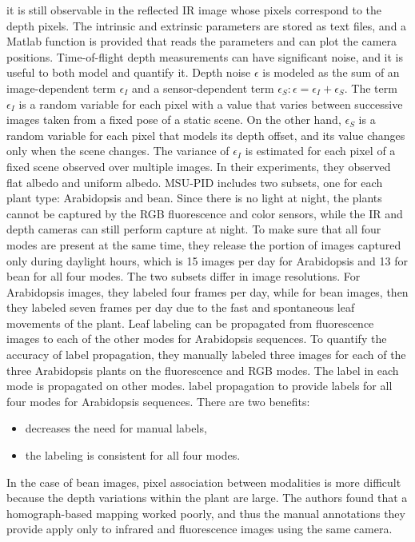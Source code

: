 it is still observable in the reflected IR image whose pixels correspond to the depth pixels. The intrinsic and extrinsic parameters are stored as text files,
and a Matlab function is provided that reads the parameters and can plot the camera positions. Time-of-flight depth measurements can have significant noise,
and it is useful to both model and quantify it. Depth noise $\epsilon$ is modeled as the sum of an image-dependent term $\epsilon_I$ and a sensor-dependent term
$\epsilon_S: \epsilon = \epsilon_I + \epsilon_S$. The term $\epsilon_I$ is a random variable for each pixel with a value that varies between successive images
taken from a fixed pose of a static scene. On the other hand, $\epsilon_S$ is a random variable for each pixel that models its depth offset, and its value changes
only when the scene changes. The variance of $\epsilon_I$ is estimated for each pixel of a fixed scene observed over multiple images. In their experiments, they observed
flat albedo and uniform albedo. MSU-PID includes two subsets, one for each plant type: Arabidopsis and bean. Since there is no light at night, the plants cannot
be captured by the RGB fluorescence and color sensors, while the IR and depth cameras can still perform capture at night. To make sure that all four modes are present
at the same time, they release the portion of images captured only during daylight hours, which is 15 images per day for Arabidopsis and 13 for bean for all four modes.
The two subsets differ in image resolutions. For Arabidopsis images, they labeled four frames per day, while for bean images, then they labeled seven frames per day due to the
fast and spontaneous leaf movements of the plant. Leaf labeling can be propagated from fluorescence images to each of the other modes for Arabidopsis sequences. To
quantify the accuracy of label propagation, they manually labeled three images for each of the three Arabidopsis plants on the fluorescence and RGB modes. The label
in each mode is propagated on other modes. label propagation to provide labels for all four modes for Arabidopsis sequences. There are two benefits:
\begin{itemize}
\item decreases the need for manual labels, 
\item the labeling is consistent for all four modes.
\end{itemize}
In the case of bean images, pixel association between modalities is more difficult because the depth variations within the plant are large. The authors found that a
homograph-based mapping worked poorly, and thus the manual annotations they provide apply only to infrared and fluorescence images using the same camera. 
